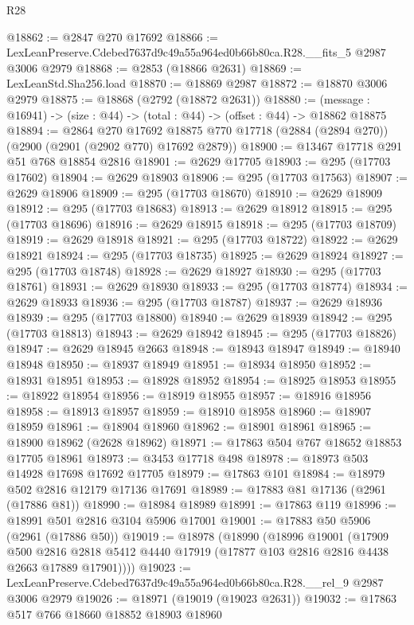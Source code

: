 \begin{lexlean}{R28}
\begin{coremodule}
@18862 := @2847 @270 @17692
@18866 := LexLeanPreserve.Cdebed7637d9c49a55a964ed0b66b80ca.R28.__fits_5 @2987 @3006 @2979
@18868 := @2853 (@18866 @2631)
@18869 := LexLeanStd.Sha256.load
@18870 := @18869 @2987
@18872 := @18870 @3006 @2979
@18875 := @18868 (@2792 (@18872 @2631))
@18880 := (message : @16941) -> (size : @44) -> (total : @44) -> (offset : @44) -> @18862 @18875
@18894 := @2864
    @270
    @17692
    @18875
    @770
    @17718
    (@2884 (@2894 @270))
    (@2900 (@2901 (@2902 @770) @17692 @2879))
@18900 := @13467 @17718 @291 @51 @768 @18854 @2816
@18901 := @2629 @17705
@18903 := @295 (@17703 @17602)
@18904 := @2629 @18903
@18906 := @295 (@17703 @17563)
@18907 := @2629 @18906
@18909 := @295 (@17703 @18670)
@18910 := @2629 @18909
@18912 := @295 (@17703 @18683)
@18913 := @2629 @18912
@18915 := @295 (@17703 @18696)
@18916 := @2629 @18915
@18918 := @295 (@17703 @18709)
@18919 := @2629 @18918
@18921 := @295 (@17703 @18722)
@18922 := @2629 @18921
@18924 := @295 (@17703 @18735)
@18925 := @2629 @18924
@18927 := @295 (@17703 @18748)
@18928 := @2629 @18927
@18930 := @295 (@17703 @18761)
@18931 := @2629 @18930
@18933 := @295 (@17703 @18774)
@18934 := @2629 @18933
@18936 := @295 (@17703 @18787)
@18937 := @2629 @18936
@18939 := @295 (@17703 @18800)
@18940 := @2629 @18939
@18942 := @295 (@17703 @18813)
@18943 := @2629 @18942
@18945 := @295 (@17703 @18826)
@18947 := @2629 @18945 @2663
@18948 := @18943 @18947
@18949 := @18940 @18948
@18950 := @18937 @18949
@18951 := @18934 @18950
@18952 := @18931 @18951
@18953 := @18928 @18952
@18954 := @18925 @18953
@18955 := @18922 @18954
@18956 := @18919 @18955
@18957 := @18916 @18956
@18958 := @18913 @18957
@18959 := @18910 @18958
@18960 := @18907 @18959
@18961 := @18904 @18960
@18962 := @18901 @18961
@18965 := @18900 @18962 (@2628 @18962)
@18971 := @17863 @504 @767 @18652 @18853 @17705 @18961
@18973 := @3453 @17718 @498
@18978 := @18973 @503 @14928 @17698 @17692 @17705
@18979 := @17863 @101
@18984 := @18979 @502 @2816 @12179 @17136 @17691
@18989 := @17883 @81 @17136 (@2961 (@17886 @81))
@18990 := @18984 @18989
@18991 := @17863 @119
@18996 := @18991 @501 @2816 @3104 @5906 @17001
@19001 := @17883 @50 @5906 (@2961 (@17886 @50))
@19019 := @18978
    (@18990
      (@18996
        @19001
        (@17909
          @500
          @2816
          @2818
          @5412
          @4440
          @17919
          (@17877 @103 @2816 @2816 @4438 @2663 @17889 @17901))))
@19023 := LexLeanPreserve.Cdebed7637d9c49a55a964ed0b66b80ca.R28.__rel_9 @2987 @3006 @2979
@19026 := @18971 (@19019 (@19023 @2631))
@19032 := @17863 @517 @766 @18660 @18852 @18903 @18960

\end{coremodule}
\end{lexlean}
